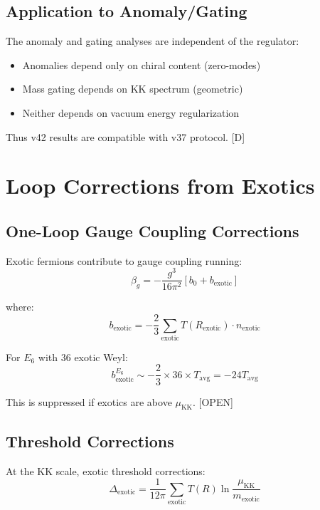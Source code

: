 \documentclass[11pt,a4paper]{article}
\newcommand{\tagD}{\textcolor{blue!70!black}{[D]}}
\newcommand{\tagOPEN}{\textcolor{red!70!black}{[OPEN]}}
\begin{document}
\subsection{Application to Anomaly/Gating}

The anomaly and gating analyses are independent of the regulator:
\begin{itemize}
    \item Anomalies depend only on chiral content (zero-modes)
    \item Mass gating depends on KK spectrum (geometric)
    \item Neither depends on vacuum energy regularization
\end{itemize}

Thus v42 results are compatible with v37 protocol. \tagD

\section{Loop Corrections from Exotics}
\label{app:loops}

\subsection{One-Loop Gauge Coupling Corrections}

Exotic fermions contribute to gauge coupling running:
\begin{equation}
\label{eq:beta-gauge}
\beta_g = -\frac{g^3}{16\pi^2} \left[b_0 + b_{\text{exotic}}\right]
\end{equation}

where:
\begin{equation}
\label{eq:b0-exotic}
b_{\text{exotic}} = -\frac{2}{3} \sum_{\text{exotic}} T(R_{\text{exotic}}) \cdot n_{\text{exotic}}
\end{equation}

For $E_6$ with 36 exotic Weyl:
\begin{equation}
\label{eq:b-e6-exotic}
b_{\text{exotic}}^{E_6} \sim -\frac{2}{3} \times 36 \times T_{\text{avg}} = -24 T_{\text{avg}}
\end{equation}

This is suppressed if exotics are above $\mu_{\text{KK}}$. \tagOPEN

\subsection{Threshold Corrections}

At the KK scale, exotic threshold corrections:
\begin{equation}
\label{eq:threshold}
\Delta_{\text{exotic}} = \frac{1}{12\pi} \sum_{\text{exotic}} T(R) \ln\frac{\mu_{\text{KK}}}{m_{\text{exotic}}}
\end{equation}
\end{document}
